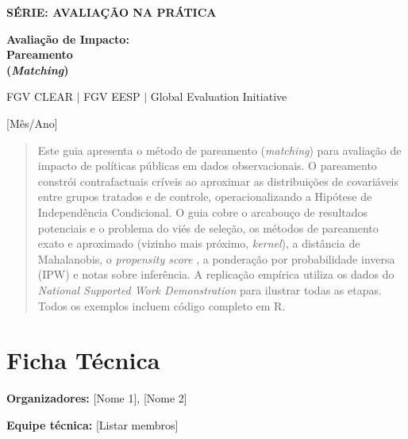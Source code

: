 \documentclass[12pt,a4paper]{article}
\begin{document}
\thispagestyle{empty}
\begin{center}
\vspace*{4cm}
{\Large\bfseries\color{clearlightblue} SÉRIE: AVALIAÇÃO NA PRÁTICA}
\vspace{1.5cm}

{\Huge\bfseries\color{clearblue} Avaliação de Impacto:\\[0.3cm]
Pareamento\\[0.3cm]
(\textit{Matching})}

\vspace{2cm}
{\large FGV CLEAR $|$ FGV EESP $|$ Global Evaluation Initiative}

\vspace{0.5cm}
{\large [Mês/Ano]}

\vfill

\begin{abstract}
\noindent Este guia apresenta o método de pareamento (\textit{matching}) para avaliação de impacto de políticas públicas em dados observacionais. O pareamento constrói contrafactuais críveis ao aproximar as distribuições de covariáveis entre grupos tratados e de controle, operacionalizando a Hipótese de Independência Condicional. O guia cobre o arcabouço de resultados potenciais e o problema do viés de seleção, os métodos de pareamento exato e aproximado (vizinho mais próximo, \textit{kernel}), a distância de Mahalanobis, o \textit{propensity score} \citep{RosenbaumRubin1983}, a ponderação por probabilidade inversa (IPW) e notas sobre inferência. A replicação empírica utiliza os dados do \textit{National Supported Work Demonstration} \citep{LalondeNSW1986,DehejiaWahba1999} para ilustrar todas as etapas. Todos os exemplos incluem código completo em R.
\end{abstract}
\end{center}
\newpage

\thispagestyle{empty}
\section*{Ficha Técnica}

\textbf{Organizadores:} [Nome 1], [Nome 2]

\textbf{Equipe técnica:} [Listar membros]

\vspace{1cm}
\end{document}
